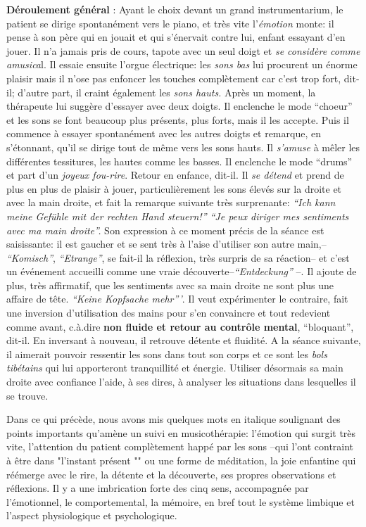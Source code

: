 \textbf{Déroulement général} :
Ayant le choix devant un grand instrumentarium,
le patient se dirige spontanément vers le piano, et très vite
l'\textit{émotion} monte: il pense à son père qui en jouait et qui
s'énervait contre lui, enfant essayant d'en
jouer. Il n'a jamais pris de cours, tapote avec un seul doigt et \textit{se considère comme
	amusica}l. Il essaie ensuite l'orgue électrique: les \textit{sons bas}
lui procurent un énorme plaisir mais il n'ose pas enfoncer les touches
complètement car c'est trop fort, dit-il; d'autre part, il
craint également les
\textit{sons hauts.}
Après un moment, la thérapeute lui suggère d'essayer avec deux doigts.
Il enclenche le mode ``choeur'' et les sons se font beaucoup
plus présents, plus forts, mais il les accepte. Puis il commence à essayer spontanément
avec les autres doigts et remarque,  en s'étonnant, qu'il se
dirige tout de même vers les sons
hauts. Il \textit{s'amuse} à mêler les différentes tessitures,
les hautes comme les basses.
Il enclenche le mode ``drums'' et part d'un\textit{ joyeux
	fou-rire}. Retour en enfance, dit-il.
Il \textit{se détend} et prend de plus en plus de plaisir à jouer, particulièrement  les sons élevés
sur la droite et avec la main droite, et fait
la remarque suivante très surprenante:
\textit{``Ich kann meine Gefühle mit der rechten Hand steuern!''
	``Je peux diriger mes sentiments avec ma main droite''.}
Son expression à ce moment précis de la séance est saisissante: il
est gaucher et se sent très à l'aise d'utiliser son autre
main,-- \textit{``Komisch''},  \textit{``Etrange''}, se fait-il
la réflexion, très surpris de sa réaction-- et c'est un événement
accueilli comme une vraie
découverte--\textit{``Entdeckung''} --.
Il ajoute de plus, très affirmatif, que les sentiments avec sa main
droite ne sont plus une affaire de tête. \textit{``Keine
	Kopfsache mehr'''}. Il veut expérimenter le contraire, fait
une inversion d'utilisation des mains pour s'en convaincre et tout redevient comme
avant, c.à.dire \textbf{non fluide et retour au contrôle
	mental},
``bloquant'', dit-il. En inversant à nouveau, il retrouve
détente et fluidité.
A la séance suivante, il aimerait pouvoir ressentir
les sons dans tout son corps et ce sont les\textit{ bols
	tibétains } qui lui
apporteront tranquillité et
énergie. Utiliser désormais sa main
droite avec confiance l'aide, à ses dires, à analyser les
situations dans lesquelles il se trouve.


Dans ce qui précède, nous avons mis quelques mots en italique soulignant des  points
importants qu'amè\-ne un suivi en musicothérapie: l'émotion qui surgit très
vite,
l'attention du patient complètement happé par les sons --qui l'ont
contraint à être dans "l'instant présent "" ou une forme de méditation, la joie
enfantine qui réémerge avec le rire, la détente et la découverte,
ses propres observations et réflexions.
Il y a une imbrication forte des cinq sens, accompagnée par l'émotionnel, le comportemental, la
mémoire, en bref tout le système limbique et l'aspect
physiologique et psychologique.

